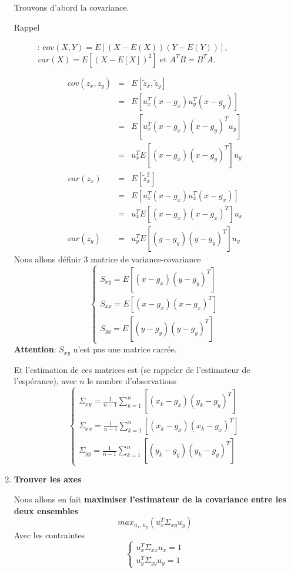 \documentclass[a4paper, 11pt, onecolumn]{article}
\begin{document}
\begin{enumerate}
\begin{framed}
Trouvons d'abord la covariance. 
\begin{description}
  \item[Rappel ]: $cov(X,Y) = E[(X-E(X))(Y-E(Y))]$, $var(X) = E[(X-E[X])^2]$ et $A^TB = B^TA$.
\end{description}
\begin{eqnarray}
cov(z_x,z_y) &=& E[\tilde z_x, \tilde z_y]\\
&=& E[u_x^T(x-g_x)u_y^T(x-g_y)]\\
&=& E[u_x^T(x-g_x)(x-g_y)^Tu_y]\\
&=& u_x^TE[(x-g_x)(x-g_y)^T]u_y\\
var(z_x) &=& E[\tilde z_x^2]\\
&=& E[u_x^T(x-g_x)u_x^T(x-g_x)]\\
&=& u_x^TE[(x-g_x)(x-g_x)^T]u_x\\
var(z_y) &=& u_y^TE[(y-g_y)(y-g_y)^T]u_y
\end{eqnarray}
Nous allons définir 3 matrice de variance-covariance
$$
\left\{
\begin{array}{l}
S_{xy}=E[(x-g_x)(y-g_y)^T]\\
S_{xx}=E[(x-g_x)(x-g_x)^T]\\
S_{yy}=E[(y-g_y)(y-g_y)^T]
\end{array}
\right.
$$
\textbf{Attention}: $S_{xy}$ n'est pas une matrice carrée.

Et l'estimation de ces matrices est (se rappeler de l'estimateur de l'espérance), avec $n$ le nombre d'observations
$$
\left\{
\begin{array}{l}
\Sigma_{xy}=\frac{1}{n-1}\sum_{k=1}^n[(x_k-g_x)(y_k-g_y)^T]\\
\Sigma_{xx}=\frac{1}{n-1}\sum_{k=1}^n[(x_k-g_x)(x_k-g_x)^T]\\
\Sigma_{yy}=\frac{1}{n-1}\sum_{k=1}^n[(y_k-g_y)(y_k-g_y)^T]
\end{array}
\right.
$$
\end{framed}

\item \textbf{Trouver les axes}

  Nous allons en fait \textbf{maximiser l'estimateur de la covariance entre les deux ensembles} 
$$max_{u_x,u_y}(u_x^T\Sigma_{xy}u_y)$$
Avec les contraintes
$$
\left\{
\begin{array}{l}
u_x^T\Sigma_{xx}u_x=1\\
u_y^T\Sigma_{yy}u_y=1
\end{array}
\right.
$$


\end{enumerate}
\end{document}
